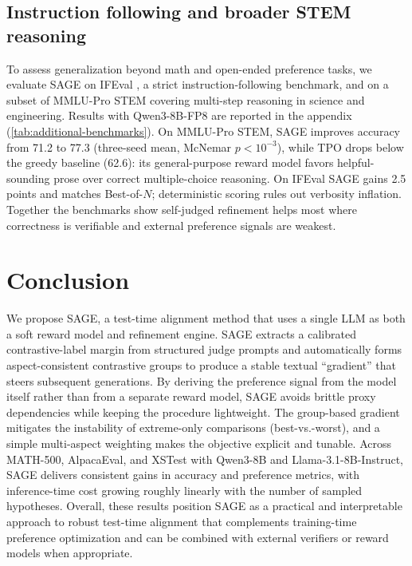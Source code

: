 \documentclass[letterpaper]{article} %
\newcommand{\method}{SAGE}
\begin{document}
{\subsection{Instruction following and broader STEM reasoning}
\label{sec:broader-benchmarks}
To assess generalization beyond math and open-ended preference tasks, we evaluate \method{} on IFEval \citep{zhou2023instruction}, a strict instruction-following benchmark, and on a subset of MMLU-Pro STEM \citep{wang2024mmlu} covering multi-step reasoning in science and engineering. Results with Qwen3-8B-FP8 are reported in the appendix (\cref{tab:additional-benchmarks}). \textcolor{orange!85!black}{On MMLU-Pro STEM, \method{} improves accuracy from 71.2 to 77.3 (three-seed mean, McNemar $p<10^{-3}$), while TPO drops below the greedy baseline (62.6): its general-purpose reward model favors helpful-sounding prose over correct multiple-choice reasoning. On IFEval \method{} gains 2.5 points and matches Best-of-\(N\); deterministic scoring rules out verbosity inflation. Together the benchmarks show self-judged refinement helps most where correctness is verifiable and external preference signals are weakest.}

}


\section{Conclusion}
\noindent We propose \method{}, a test-time alignment method that uses a single LLM as both a soft reward model and refinement engine. \method{} extracts a calibrated contrastive-label margin from structured judge prompts and automatically forms aspect-consistent 
contrastive
groups to produce a stable textual ``gradient'' that steers subsequent generations. By deriving the preference signal from the model itself rather than from a separate reward model, \method{} avoids brittle proxy dependencies while keeping the procedure lightweight. The group-based gradient mitigates the instability of extreme-only comparisons (best-vs.-worst), and a simple multi-aspect weighting makes the objective explicit and tunable. Across MATH-500, AlpacaEval, and XSTest with Qwen3-8B and Llama-3.1-8B-Instruct, \method{} delivers consistent gains in accuracy and preference metrics, with inference-time cost growing roughly linearly with the number of sampled hypotheses. Overall, these results position \method{} as a practical and interpretable approach to robust test-time alignment that complements training-time preference optimization and can be combined with external verifiers or reward models when appropriate.
\end{document}
